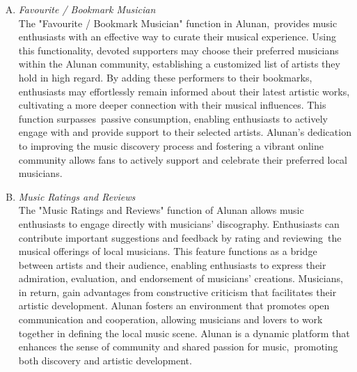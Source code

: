 \begin{enumerate}[A.]
    \item \textit{Favourite / Bookmark Musician}\\
    The "Favourite / Bookmark Musician" function in Alunan, provides music enthusiasts with an effective way to curate their musical experience. Using this functionality, devoted supporters may choose their preferred musicians within the Alunan community, establishing a customized list of artists they hold in high regard. By adding these performers to their bookmarks, enthusiasts may effortlessly remain informed about their latest artistic works, cultivating a more deeper connection with their musical influences. This function surpasses passive consumption, enabling enthusiasts to actively engage with and provide support to their selected artists. Alunan's dedication to improving the music discovery process and fostering a vibrant online community allows fans to actively support and celebrate their preferred local musicians.
    \item \textit{Music Ratings and Reviews}\\
    The "Music Ratings and Reviews" function of Alunan allows music enthusiasts to engage directly with musicians' discography. Enthusiasts can contribute important suggestions and feedback by rating and reviewing the musical offerings of local musicians. This feature functions as a bridge between artists and their audience, enabling enthusiasts to express their admiration, evaluation, and endorsement of musicians' creations. Musicians, in return, gain advantages from constructive criticism that facilitates their artistic development. Alunan fosters an environment that promotes open communication and cooperation, allowing musicians and lovers to work together in defining the local music scene. Alunan is a dynamic platform that enhances the sense of community and shared passion for music, promoting both discovery and artistic development.
\end{enumerate}

